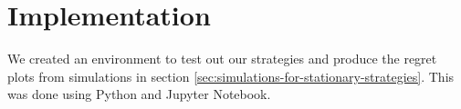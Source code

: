 \section{Implementation}\label{sec:implementation}

We created an environment to test out our strategies and produce the regret plots from simulations in section \ref{sec:simulations-for-stationary-strategies}.
This was done using Python and Jupyter Notebook.
